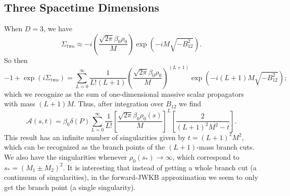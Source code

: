\subsection{Three Spacetime Dimensions}
When $D = 3$, we have
\begin{equation}
	\Sigma_{\text{two}} \approx -i \left( \frac{\sqrt{2 \pi} \beta_{0} \rho_{0}}{M} \right) \exp{\left( -i M \sqrt{-B_{12}^{2}}\right)}.
\end{equation}
So then
\begin{equation}
	{-1} + \exp{(i \Sigma_{\text{two}})} = \sum_{L = 0}^{\infty} \frac{1}{L! (L+1)} \left( \frac{\sqrt{2 \pi} \beta_{0} \rho_{0}}{M} \right)^{(L+1)} \exp{\left( -i (L+1) M \sqrt{-B_{12}^{2}}\right)};
\end{equation}
which we recognize as the sum of one-dimensional massive scalar propagators with mass $(L+1)M$. Thus, after integration over $B_{12}$ we find
\begin{equation}
	\mathcal{A}(s, t) = \beta_{0} \delta(P) \sum_{L = 0}^{\infty} \frac{1}{L!} \left[ \frac{\sqrt{2 \pi} \beta_{0} \rho_{0}(s)}{M} \right]^{L} \left[ \frac{2}{(L+1)^{2} M^{2} - t} \right].
	\label{3Avarphi}
\end{equation}
This result has an infinite number of singularities given by $t = (L+1)^{2}M^{2}$, which can be recognized as the branch points of the $(L+1)$-mass branch cuts. We also have the singularities whenever $\rho_{0}(s_{*}) \rightarrow \infty$, which correspond to $s_{*} = (M_{1} \pm M_{2})^{2}$. It is interesting that instead of getting a whole branch cut (a continuum of singularities), in the forward-JWKB approximation we seem to only get the branch point (a single singularity).

